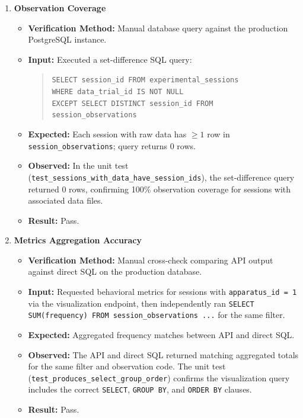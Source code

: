\documentclass[12pt, titlepage]{article}
\begin{document}
\begin{enumerate}[label=\textbf{FR4-T\arabic*:}, leftmargin=*, labelsep=1em]
\sloppy

  \item \textbf{Observation Coverage}
  \begin{itemize}
    \item \textbf{Verification Method:} Manual database query against the production PostgreSQL instance.
    \item \textbf{Input:} Executed a set-difference SQL query:
      \begin{quote}\small\texttt{SELECT session\_id FROM experimental\_sessions}\\
      \texttt{WHERE data\_trial\_id IS NOT NULL}\\
      \texttt{EXCEPT SELECT DISTINCT session\_id FROM session\_observations}\end{quote}
    \item \textbf{Expected:} Each session with raw data has $\geq 1$ row in \texttt{session\_observations}; query returns 0 rows.
    \item \textbf{Observed:} In the unit test (\texttt{test\_\allowbreak{}sessions\_\allowbreak{}with\_\allowbreak{}data\_\allowbreak{}have\_\allowbreak{}session\_\allowbreak{}ids}), 
      the set-difference query returned 0 rows, confirming 100\% observation coverage for sessions with associated data files.
    \item \textbf{Result:} Pass.
  \end{itemize}

  \item \textbf{Metrics Aggregation Accuracy}
  \begin{itemize}
    \item \textbf{Verification Method:} Manual cross-check comparing API output against direct SQL on the production database.
    \item \textbf{Input:} Requested behavioral metrics for sessions with \texttt{apparatus\_id = 1} via
      the visualization endpoint, then independently ran
      \texttt{SELECT SUM(frequency) FROM session\_\allowbreak{}observations ...} for the same filter.
    \item \textbf{Expected:} Aggregated frequency matches between API and direct SQL.
    \item \textbf{Observed:} The API and direct SQL returned matching aggregated totals for the same filter
      and observation code. The unit test (\texttt{test\_\allowbreak{}produces\_\allowbreak{}select\_\allowbreak{}group\_\allowbreak{}order}) confirms the
      visualization query includes the correct \texttt{SELECT}, \texttt{GROUP BY}, and \texttt{ORDER BY} clauses.
    \item \textbf{Result:} Pass.
  \end{itemize}


\end{enumerate}
\end{document}
